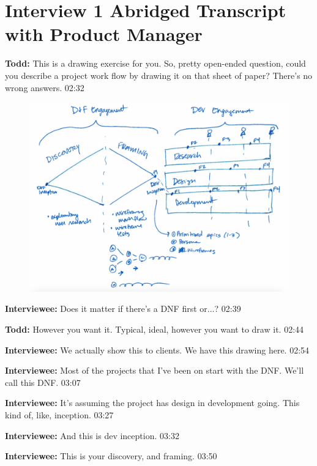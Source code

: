 \section{Interview 1 Abridged Transcript with Product Manager }

\textbf{Todd:} This is a drawing exercise for you. So, pretty open-ended question, could you describe a project work flow by drawing it on that sheet of paper? There's no wrong answers. 02:32

\begin{figure}[ht]
\centering
\includegraphics[width=6.5in]{interviews/drawings/2015_05_29.png}
\caption{}
\label{2015_05_29}
\end{figure}

\textbf{Interviewee:} Does it matter if there's a DNF first or...? 02:39

\textbf{Todd:} However you want it. Typical, ideal, however you want to draw it. 02:44

\textbf{Interviewee:} We actually show this to clients. We have this drawing here. 02:54

\textbf{Interviewee:} Most of the projects that I've been on start with the DNF. We'll call this DNF. 03:07

\textbf{Interviewee:} It's assuming the project has design in development going. This kind of, like, inception. 03:27

\textbf{Interviewee:} And this is dev inception. 03:32

\textbf{Interviewee:} This is your discovery, and framing. 03:50

